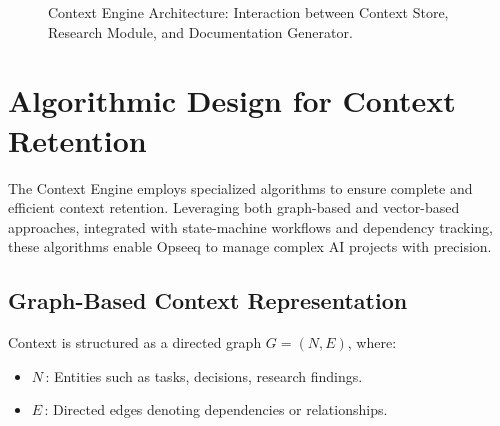 \documentclass[11pt]{article}
\begin{document}
\begin{figure}[ht]
  \centering
  \caption{Context Engine Architecture: Interaction between Context Store, Research Module, and Documentation Generator.}
  \label{fig:architecture}
\end{figure}

\section{Algorithmic Design for Context Retention}
\label{sec:algorithms}

The Context Engine employs specialized algorithms to ensure complete and efficient context retention. Leveraging both graph-based and vector-based approaches, integrated with state-machine workflows and dependency tracking, these algorithms enable Opseeq to manage complex AI projects with precision.

\subsection{Graph-Based Context Representation}
\label{subsec:graph_context}

Context is structured as a directed graph \(G = (N, E)\), where:

\begin{itemize}
  \item \(N\)\,: Entities such as tasks, decisions, research findings.
  \item \(E\)\,: Directed edges denoting dependencies or relationships.
\end{itemize}
\end{document}
